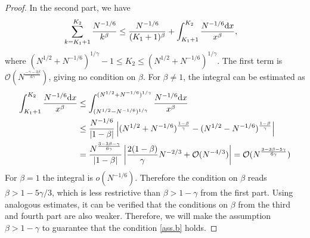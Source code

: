 \begin{proof}
In the second part, we have 
\begin{equation*}
\begin{aligned}
\sum_{k=K_1+1}^{K_2} \frac{N^{-1/6}}{k^{\beta} }
&\leq \frac{N^{-1/6}}{(K_1+1)^{\beta}} + \int_{K_1+1}^{K_2} \frac{N^{-1/6} {{{\rm d}}} x}{x^\beta},
\end{aligned}
\end{equation*} 
where $(N^{1/2} + N^{-1/6})^{1/\gamma}-1 \leq K_2 \leq (N^{1/2} + N^{-1/6})^{1/\gamma}$. The first term is $\mathcal{O}(N^{\frac{-\gamma-3\beta}{6 \gamma}})$, giving no condition on $\beta$. For $\beta \neq 1$, the integral can be estimated as
\begin{equation*}
\begin{aligned}
\int_{K_1+1}^{K_2} \frac{N^{-1/6} {{{\rm d}}} x}{x^\beta}
& \leq
\int_{(N^{1/2}-N^{-1/6})^{1/\gamma} }^{(N^{1/2}+N^{-1/6})^{1/\gamma} } \frac{N^{-1/6} {{{\rm d}}} x}{x^\beta} 
\\
&\leq \frac{N^{-1/6}}{|1-\beta|}
\left|
(N^{1/2}+N^{-1/6})^{\frac{1-\beta}{\gamma}} - (N^{1/2}-N^{-1/6})^{\frac{1-\beta}{\gamma}}
\right|
\\
& = \frac{N^{\frac{3-3\beta-\gamma}{6 \gamma}}}{|1-\beta|} 
\left|
\frac{2(1-\beta)}{\gamma}N^{-2/3} + \mathcal{O}(N^{-4/3})
\right|  
= \mathcal{O}(N^{\frac{3-3\beta-5\gamma}{6 \gamma}})
\end{aligned}
\end{equation*}
For $\beta =1$ the integral is $o(N^{-1/6})$. Therefore the condition on $\beta$ reads $\beta > 1 - 5\gamma/3$, which is less restrictive than $\beta >1-\gamma$ from the first part. Using analogous estimates, it can be verified that the conditions on $\beta$ from the third and fourth part are also weaker. Therefore, we will make the assumption $\beta > 1-\gamma$ to guarantee that the condition \eqref{ass.b} holds.
\end{proof}

